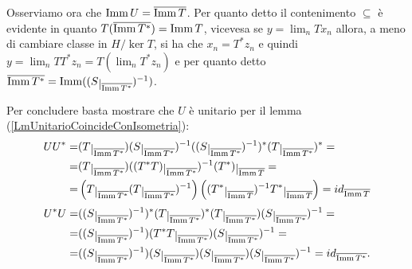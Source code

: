 \documentclass[a4paper]{article}
\begin{document}
\begin{solution}
\begin{enumerate}
\begin{itemize}
Osserviamo ora che $\operatorname{Imm} U=\overline{\operatorname{Imm} T}$. Per quanto detto il contenimento $\subseteq$ \`e evidente in quanto $T(\overline{\operatorname{Imm} T^\ast})=\operatorname{Imm} T$, vicevesa se $y=\lim_n Tx_n$ allora, a meno di cambiare classe in $H/\ker T$, si ha che $x_n=T^\ast z_n$ e quindi $y=\lim_n TT^\ast z_n=T(\lim_nT^\ast z_n)$ e per quanto detto $\ol{\imm T^\ast}=\imm((S\res{\ol{\imm T^\ast}})\ii)$.

Per concludere basta mostrare che $U$ \`e unitario per il lemma (\ref{LmUnitarioCoincideConIsometria}):
\begin{align*}
UU^\ast=&(T\res{\ol{\imm T^\ast}})(S\res{\ol{\imm T^\ast}})\ii((S\res{\ol{\imm T^\ast}})\ii)^\ast (T\res{\ol{\imm T^\ast}})^\ast=\\
=&(T\res{\ol{\imm T^\ast}})((T^\ast T)\res{\ol{\imm T^\ast}})\ii (T^\ast)\res{\ol{\imm T}}=\\
=&\pa{T\res{\ol{\imm T^\ast}} (T\res{\ol{\imm T^\ast}})\ii}\pa{(T^\ast\res{\ol{\imm T}})\ii T^\ast\res{\ol{\imm T}}}=id_{\ol{\imm T}}
\end{align*}
\begin{align*}
U^\ast U=&((S\res{\ol{\imm T^\ast}})\ii)^\ast (T\res{\ol{\imm T^\ast}})^\ast(T\res{\ol{\imm T^\ast}})(S\res{\ol{\imm T^\ast}})\ii=\\
=&((S\res{\ol{\imm T^\ast}})\ii) (T^\ast T\res{\ol{\imm T^\ast}})(S\res{\ol{\imm T^\ast}})\ii=\\
=&((S\res{\ol{\imm T^\ast}})\ii) (S\res{\ol{\imm T^\ast}})(S\res{\ol{\imm T^\ast}})(S\res{\ol{\imm T^\ast}})\ii=id_{\ol{\imm T^\ast}}.
\end{align*}
~
\end{itemize}


\end{enumerate}
\end{solution}
\end{document}
